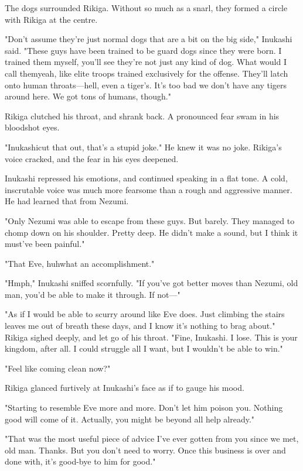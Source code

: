 The dogs surrounded Rikiga. Without so much as a snarl, they formed a
circle with Rikiga at the centre.

"Don't assume they're just normal dogs that are a bit on the big side,"
Inukashi said. "These guys have been trained to be guard dogs since they
were born. I trained them myself, you'll see they're not just any kind
of dog. What would I call them\el yeah, like elite troops trained
exclusively for the offense. They'll latch onto human throats---hell, even
a tiger's. It's too bad we don't have any tigers around here. We got
tons of humans, though."

Rikiga clutched his throat, and shrank back. A pronounced fear swam in
his bloodshot eyes.

"Inukashi\el cut that out, that's a stupid joke." He knew it was no
joke. Rikiga's voice cracked, and the fear in his eyes deepened.

Inukashi repressed his emotions, and continued speaking in a flat tone.
A cold, inscrutable voice was much more fearsome than a rough and
aggressive manner. He had learned that from Nezumi.

"Only Nezumi was able to escape from these guys. But barely. They
managed to chomp down on his shoulder. Pretty deep. He didn't make a
sound, but I think it must've been painful."

"That Eve, huh\el what an accomplishment."

"Hmph," Inukashi sniffed scornfully. "If you've got better moves than
Nezumi, old man, you'd be able to make it through. If not---"

"As if I would be able to scurry around like Eve does. Just climbing the
stairs leaves me out of breath these days, and I know it's nothing to
brag about." Rikiga sighed deeply, and let go of his throat. "Fine,
Inukashi. I lose. This is your kingdom, after all. I could struggle all
I want, but I wouldn't be able to win."

"Feel like coming clean now?"

Rikiga glanced furtively at Inukashi's face as if to gauge his mood.

"Starting to resemble Eve more and more. Don't let him poison you.
Nothing good will come of it. Actually, you might be beyond all help
already."

"That was the most useful piece of advice I've ever gotten from you
since we met, old man. Thanks. But you don't need to worry. Once this
business is over and done with, it's good-bye to him for good."

